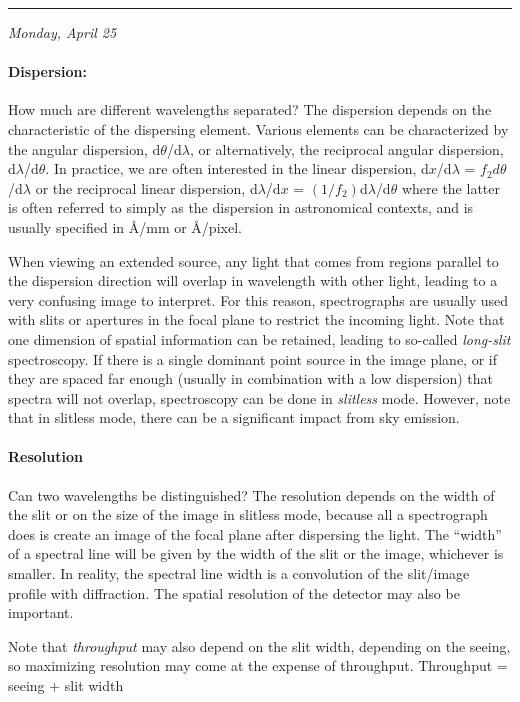 \documentclass[12pt]{article}
\newcommand{\mynotes}[1]{\textcolor{myBlue}{#1}}
\newcommand{\mydate}[1]{
    \begin{flushright}
        \rule{\textwidth}{0.4pt} %
        \small\hfill\textit{#1}
    \end{flushright}}
\begin{document}
\mydate{Monday, April 25}

\paragraph{Dispersion:}
\mynotes{How much are different wavelengths separated?}
The dispersion depends on the characteristic of the dispersing element. Various
elements can be characterized by the angular dispersion, d$\theta$/d$\lambda$,
or alternatively, the reciprocal angular dispersion, d$\lambda$/d$\theta$. In
practice, we are often interested in the linear dispersion, d$x$/d$\lambda$ =
$f_{2}d\theta$/d$\lambda$ or the reciprocal linear dispersion, d$\lambda$/d$x$
= $(1/f_{2})$d$\lambda$/d$\theta$ where the latter is often referred to
simply as the dispersion in astronomical contexts, and is usually specified in
\AA{}/mm or \AA{}/pixel.

When viewing an extended source, any light that comes from regions parallel to
the dispersion direction will overlap in wavelength with other light, leading
to a very confusing image to interpret. For this reason, spectrographs are
usually used with slits or apertures in the focal plane to restrict the
incoming light. Note that one dimension of spatial information can be retained,
leading to so-called \textit{long-slit} spectroscopy. If there is a single
dominant point source in the image plane, or if they are spaced far enough
(usually in combination with a low dispersion) that spectra will not overlap,
spectroscopy can be done in \textit{slitless} mode. However, note that in
slitless mode, there can be a significant impact from sky emission.

\paragraph{Resolution}
\mynotes{Can two wavelengths be distinguished?}
The resolution depends on the width of the slit or on the size of the image in
slitless mode, because all a spectrograph does is create an image of the focal
plane after dispersing the light. The ``width'' of a spectral line will be
given by the width of the slit or the image, whichever is smaller. In reality,
the spectral line width is a convolution of the slit/image profile with
diffraction. The spatial resolution of the detector may also be important.

Note that \textit{throughput} may also depend on the slit width, depending on
the seeing, so maximizing resolution may come at the expense of
throughput. \mynotes{Throughput = seeing + slit width}
\end{document}
